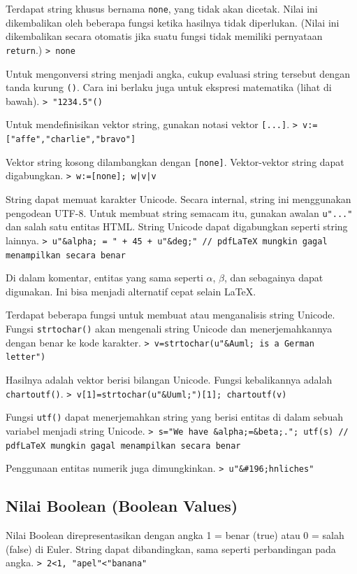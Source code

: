 \documentclass[11pt, a4paper]{article}
\newcommand{\emtcmd}[1]{\noindent\texttt{\textcolor{emtcommand}{>}\ #1}\par\smallskip}
\begin{document}
Terdapat string khusus bernama \texttt{none}, yang tidak akan dicetak. Nilai ini dikembalikan oleh beberapa fungsi ketika hasilnya tidak diperlukan. (Nilai ini dikembalikan secara otomatis jika suatu fungsi tidak memiliki pernyataan \texttt{return}.)
\emtcmd{none}

Untuk mengonversi string menjadi angka, cukup evaluasi string tersebut dengan tanda kurung \texttt{()}. Cara ini berlaku juga untuk ekspresi matematika (lihat di bawah).
\emtcmd{"1234.5"()}

Untuk mendefinisikan vektor string, gunakan notasi vektor \texttt{[...]}.
\emtcmd{v:=["affe","charlie","bravo"]}

Vektor string kosong dilambangkan dengan \texttt{[none]}. Vektor-vektor string dapat digabungkan.
\emtcmd{w:=[none]; w|v|v}

String dapat memuat karakter Unicode. Secara internal, string ini menggunakan pengodean UTF-8. Untuk membuat string semacam itu, gunakan awalan \texttt{u"..."} dan salah satu entitas HTML. String Unicode dapat digabungkan seperti string lainnya.
\emtcmd{u"\&alpha; = " + 45 + u"\&deg;" \textcolor{emtcomment}{// pdfLaTeX mungkin gagal menampilkan secara benar}}

Di dalam komentar, entitas yang sama seperti $\alpha$, $\beta$, dan sebagainya dapat digunakan. Ini bisa menjadi alternatif cepat selain LaTeX.

Terdapat beberapa fungsi untuk membuat atau menganalisis string Unicode. Fungsi \texttt{strtochar()} akan mengenali string Unicode dan menerjemahkannya dengan benar ke kode karakter.
\emtcmd{v=strtochar(u"\&Auml; is a German letter")}

Hasilnya adalah vektor berisi bilangan Unicode. Fungsi kebalikannya adalah \texttt{chartoutf()}.
\emtcmd{v[1]=strtochar(u"\&Uuml;")[1]; chartoutf(v)}

Fungsi \texttt{utf()} dapat menerjemahkan string yang berisi entitas di dalam sebuah variabel menjadi string Unicode.
\emtcmd{s="We have \&alpha;=\&beta;."; utf(s) \textcolor{emtcomment}{// pdfLaTeX mungkin gagal menampilkan secara benar}}

Penggunaan entitas numerik juga dimungkinkan.
\emtcmd{u"\&\#196;hnliches"}

\subsection*{Nilai Boolean (Boolean Values)}

Nilai Boolean direpresentasikan dengan angka 1 = benar (true) atau 0 = salah (false) di Euler. String dapat dibandingkan, sama seperti perbandingan pada angka.
\emtcmd{2<1, "apel"<"banana"}
\end{document}
